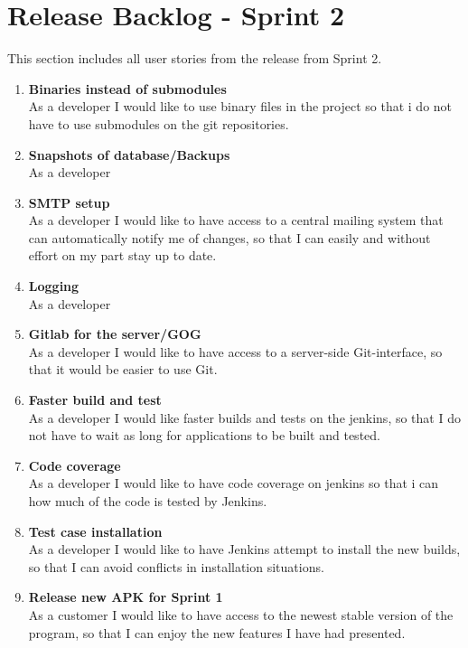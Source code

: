 \section{Release Backlog - Sprint 2}
This section includes all user stories from the release from Sprint 2.

\begin{enumerate}

\item \textbf{Binaries instead of submodules}\\
As a developer I would like to use binary files in the project so that i do not have to use submodules on the git repositories.

\item \textbf{Snapshots of database/Backups}\\
As a developer

\item \textbf{SMTP setup}\\
As a developer I would like to have access to a central mailing system that can automatically notify me of changes, so that I can easily and without effort on my part stay up to date.

\item \textbf{Logging}\\
As a developer

\item \textbf{Gitlab for the server/GOG}\\
As a developer I would like to have access to a server-side Git-interface, so that it would be easier to use Git.

\item \textbf{Faster build and test}\\
As a developer I would like faster builds and tests on the jenkins, so that I do not have to wait as long for applications to be built and tested.

\item \textbf{Code coverage}\\
As a developer I would like to have code coverage on jenkins so that i can how much of the code is tested by Jenkins.

\item \textbf{Test case installation}\\
As a developer I would like to have Jenkins attempt to install the new builds, so that I can avoid conflicts in installation situations.

\item \textbf{Release new APK for Sprint 1}\\
As a customer I would like to have access to the newest stable version of the program, so that I can enjoy the new features I have had presented.


\end{enumerate}
